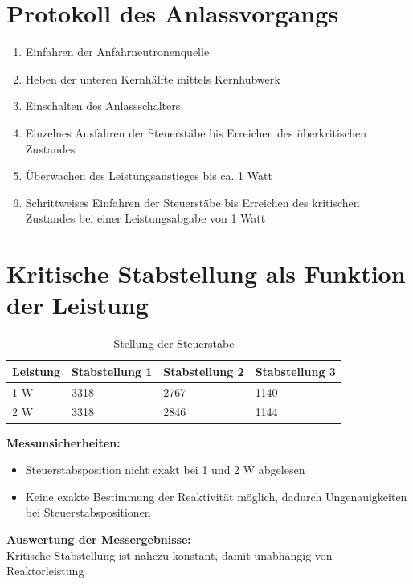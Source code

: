 \documentclass[12pt,german]{article}
\begin{document}
	\newpage
	
	\section{Protokoll des Anlassvorgangs}
	\begin{enumerate}
		\item Einfahren der Anfahrneutronenquelle
		\item Heben der unteren Kernhälfte mittels Kernhubwerk
		\item Einschalten des Anlassschalters
		\item Einzelnes Ausfahren der Steuerstäbe bis Erreichen des überkritischen Zustandes
		\item Überwachen des Leistungsanstieges bis ca. 1 Watt
		\item Schrittweises Einfahren der Steuerstäbe bis Erreichen des kritischen Zustandes bei einer Leistungsabgabe von 1 Watt
	\end{enumerate}

	\section{Kritische Stabstellung als Funktion der Leistung}
	\begin{table}[htpb]
		\begin{tabularx}{\textwidth}{X|X|X|X}
			Leistung & Stabstellung 1 & Stabstellung 2 & Stabstellung 3 \\
			\hline
			1 W & 3318 & 2767 & 1140 \\
			2 W & 3318 & 2846 & 1144
		\end{tabularx}
		\caption{Stellung der Steuerstäbe}
	\end{table}

	\noindent
	\textbf{Messunsicherheiten:}
	\begin{itemize}
		\item Steuerstabsposition nicht exakt bei 1 und 2 W abgelesen
		\item Keine exakte Bestimmung der Reaktivität möglich, dadurch Ungenauigkeiten bei Steuerstabspositionen
	\end{itemize}

	\noindent
	\textbf{Auswertung der Messergebnisse:} \\
	Kritische Stabstellung ist nahezu konstant, damit unabhängig von Reaktorleistung
\end{document}
